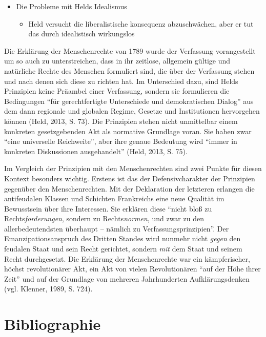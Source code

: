 \documentclass[ngerman,12pt, titlepage, smallheadings, nomath]{scrartcl}
\providecommand{\tightlist}{%
  \setlength{\itemsep}{0pt}\setlength{\parskip}{0pt}}
\begin{document}
\begin{itemize}
\tightlist
\item
  Die Probleme mit Helds Idealismus

  \begin{itemize}
  \tightlist
  \item
    Held versucht die liberalistische konsequenz abzuschwächen, aber er
    tut das durch idealistisch wirkungslos
  \end{itemize}
\end{itemize}

Die Erklärung der Menschenrechte von 1789 wurde der Verfassung
vorangestellt um so auch zu unterstreichen, dass in ihr zeitlose,
allgemein gültige und natürliche Rechte des Menschen formuliert sind,
die über der Verfassung stehen und nach denen sich diese zu richten hat.
Im Unterschied dazu, sind Helds Prinzipien keine Präambel einer
Verfassung, sondern sie formulieren die Bedingungen \enquote{für
gerechtfertigte Unterschiede und demokratischen Dialog} aus dem dann
regionale und globalen Regime, Gesetze und Institutionen hervorgehen
können (Held, 2013, S. 73). Die Prinzipien stehen nicht unmittelbar
einem konkreten gesetzgebenden Akt als normative Grundlage voran. Sie
haben zwar \enquote{eine universelle Reichweite}, aber ihre genaue
Bedeutung wird \enquote{immer in konkreten Diskussionen ausgehandelt}
(Held, 2013, S. 75).

Im Vergleich der Prinzipien mit den Menschenrechten sind zwei Punkte für
diesen Kontext besonders wichtig. Erstens ist das der Defensivcharakter
der Prinzipien gegenüber den Menschenrechten. Mit der Deklaration der
letzteren erlangen die antifeudalen Klassen und Schichten Frankreichs
eine neue Qualität im Bewusstsein über ihre Interessen. Sie erklären
diese \enquote{nicht bloß zu Rechts\emph{forderungen}, sondern zu
Rechts\emph{normen}, und zwar zu den allerbedeutendsten überhaupt --
nämlich zu Verfassungsprinzipien}. Der Emanzipationsanspruch des Dritten
Standes wird nunmehr nicht \emph{gegen} den feudalen Staat und sein
Recht gerichtet, sondern \emph{mit} dem Staat und seinem Recht
durchgesetzt. Die Erklärung der Menschenrechte war ein kämpferischer,
höchst revolutionärer Akt, ein Akt von vielen Revolutionären
\enquote{auf der Höhe ihrer Zeit} und auf der Grundlage von mehreren
Jahrhunderten Aufklärungsdenken (vgl. Klenner, 1989, S. 724).

\section*{Bibliographie}\label{bibliographie}
\end{document}
